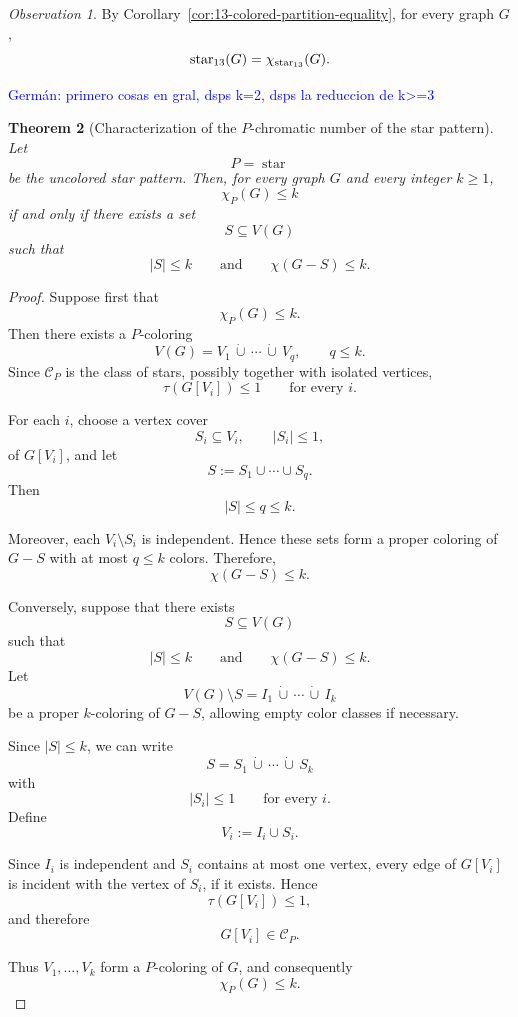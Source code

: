\documentclass[12pt]{article}
\theoremstyle{plain}
\newtheorem{theorem}{Theorem}[section]
\theoremstyle{definition}
\theoremstyle{remark}
\newtheorem{observation}[theorem]{Observation}
\theoremstyle{definition}
\newcommand{\starlabel}{\mathrm{star}}
\DeclareRobustCommand{\starname}{%
  \ensuremath{\mathop{\starlabel}\nolimits}%
}
\DeclareRobustCommand{\starparam}[1]{%
  \ensuremath{\mathop{\starlabel}\nolimits_{#1}}%
}
\newcommand{\german}[1]{%
  \textcolor{blue}{Germán: #1}%
}
\begin{document}
\begin{observation}
By Corollary~\ref{cor:13-colored-partition-equality}, for every graph \(G\),
\[
\starparam{13}(G)=\chi_{\starparam{13}}(G).
\]
\end{observation}


\german{primero cosas en gral, dsps k=2, dsps la reduccion de k>=3}

\begin{theorem}[Characterization of the \(P\)-chromatic number of the star pattern]
\label{thm:star-P-chromatic-number}
Let
\[
P=\starname
\]
be the uncolored star pattern. Then, for every graph \(G\) and every
integer \(k\ge 1\),
\[
\chi_P(G)\le k
\]
if and only if there exists a set
\[
S\subseteq V(G)
\]
such that
\[
|S|\le k
\qquad\text{and}\qquad
\chi(G-S)\le k.
\]
\end{theorem}

\begin{proof}
Suppose first that
\[
\chi_P(G)\le k.
\]
Then there exists a \(P\)-coloring
\[
V(G)=V_1\,\dot\cup\,\cdots\,\dot\cup\,V_q,
\qquad
q\le k.
\]
Since \(\mathcal C_P\) is the class of stars, possibly together with
isolated vertices,
\[
\tau(G[V_i])\le1
\qquad
\text{for every }i.
\]

For each \(i\), choose a vertex cover
\[
S_i\subseteq V_i,
\qquad
|S_i|\le1,
\]
of \(G[V_i]\), and let
\[
S:=S_1\cup\cdots\cup S_q.
\]
Then
\[
|S|\le q\le k.
\]

Moreover, each \(V_i\setminus S_i\) is independent. Hence these sets form
a proper coloring of \(G-S\) with at most \(q\le k\) colors. Therefore,
\[
\chi(G-S)\le k.
\]

Conversely, suppose that there exists
\[
S\subseteq V(G)
\]
such that
\[
|S|\le k
\qquad\text{and}\qquad
\chi(G-S)\le k.
\]
Let
\[
V(G)\setminus S
=
I_1\,\dot\cup\,\cdots\,\dot\cup\,I_k
\]
be a proper \(k\)-coloring of \(G-S\), allowing empty color classes if
necessary.

Since \(|S|\le k\), we can write
\[
S=S_1\,\dot\cup\,\cdots\,\dot\cup\,S_k
\]
with
\[
|S_i|\le1
\qquad
\text{for every }i.
\]
Define
\[
V_i:=I_i\cup S_i.
\]

Since \(I_i\) is independent and \(S_i\) contains at most one vertex,
every edge of \(G[V_i]\) is incident with the vertex of \(S_i\), if it
exists. Hence
\[
\tau(G[V_i])\le1,
\]
and therefore
\[
G[V_i]\in\mathcal C_P.
\]

Thus \(V_1,\dots,V_k\) form a \(P\)-coloring of \(G\), and consequently
\[
\chi_P(G)\le k.
\]
\end{proof}
\end{document}
